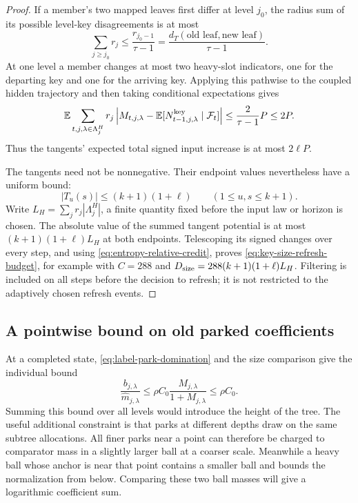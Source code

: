 \begin{proof}
If a member's two mapped leaves first differ at level $j_0$, the
radius sum of its possible level-key disagreements is at most
\begin{equation}\label{eq:key-disagreement-sum}
 \sum_{j\ge j_0}r_j
       \le\frac{r_{j_0-1}}{\tau-1}
       =\frac{d_T(\text{old leaf},\text{new leaf})}{\tau-1}.
\end{equation}
At one level a member changes at most two heavy-slot indicators, one
for the departing key and one for the arriving key.  Applying this
pathwise to the coupled hidden trajectory and then taking conditional
expectations gives
\begin{equation}\label{eq:key-count-drift}
 \mathbb E\sum_{t,j,\lambda\in\Lambda_j^H}r_j
 \left|M_{t,j,\lambda}
       -\mathbb E[N_{t-1,j,\lambda}^{\rm key}\mid\mathcal F_t]\right|
 \le\frac{2}{\tau-1}P\le2P.
\end{equation}
Thus the tangents' expected total signed input increase is at most
$2\ell P$.

The tangents need not be nonnegative.  Their endpoint values nevertheless
have a uniform bound:
\[
 |T_u(s)|\le(k+1)(1+\ell)
       \qquad(1\le u,s\le k+1).
\]
Write $L_H=\sum_j r_j|\Lambda_j^H|$, a finite quantity fixed before
the input law or horizon is chosen.  The absolute value of the summed
tangent potential is at most $(k+1)(1+\ell)L_H$ at both endpoints.
Telescoping its signed changes over every step, and using
\eqref{eq:entropy-relative-credit}, proves
\eqref{eq:key-size-refresh-budget}, for example with
$C=288$ and
$D_{\rm size}=288(k+1)(1+\ell)L_H$.  Filtering is included on all steps
before the decision to refresh; it is not restricted to the adaptively
chosen refresh events.
\end{proof}

\subsection{A pointwise bound on old parked coefficients}

At a completed state, \eqref{eq:label-park-domination} and the size
comparison give the individual bound
\begin{equation}\label{eq:individual-park-coefficient}
 \frac{b_{j,\lambda}}{\widehat m_{j,\lambda}}
 \le\rho C_0\frac{M_{j,\lambda}}{1+M_{j,\lambda}}
 \le\rho C_0.
\end{equation}
Summing this bound over all levels would introduce the height of the
tree.  The useful additional constraint is that parks at different depths
draw on the same subtree allocations.  All finer parks near a point can
therefore be charged to comparator mass in a slightly larger ball at a
coarser scale.  Meanwhile a heavy ball whose anchor is near that point
contains a smaller ball and bounds the normalization from below.
Comparing these two ball masses will give a logarithmic coefficient sum.

